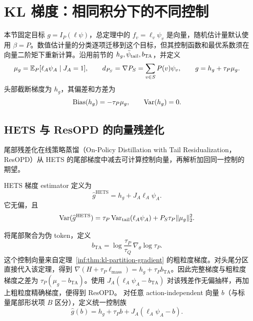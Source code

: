 \section{KL 梯度：相同积分下的不同控制}
\label{est:sec:kl-vector}
本节固定目标 $g=I_P(\ell\psi)$，总定理中的 $f_v=\ell_v\psi_v$ 是向量，随机估计量默认使用 $\beta=P$。数值估计量的分类逐项迁移到这个目标，但其控制函数和最优系数须在向量二阶矩下重新计算。沿用前节的 $h_g,\bar \psi_{\mathrm{tail}},b_{\mathrm{TA}}$，并定义
\begin{equation*}
 \mu_g=\mathbb E_P[\ell_A\psi_A\mid J_A=1],\qquad
 d_{P_S}=\nabla P_S=\sum_{v\in S}P(v)\psi_v,\qquad g=h_g+\tau_P\mu_g.
\end{equation*}
头部截断梯度为 $h_g$，其偏差和方差为
\begin{equation}
 \operatorname{Bias}(h_g)=-\tau_P\mu_g,
 \qquad \operatorname{Var}(h_g)=0.
 \label{est:eq:chapter3-head-grad-bias}
\end{equation}

\subsection{HETS 与 ResOPD 的向量残差化}

尾部残差化在线策略蒸馏（On-Policy Distillation with Tail Residualization，ResOPD）从 HETS 的尾部梯度中减去可计算控制向量，再解析加回同一控制的期望。

HETS 梯度 estimator 定义为
\begin{equation}
 \widehat g^{\mathrm{HETS}}=h_g+J_A \ell_A\psi_A.
 \label{est:eq:chapter3-hets-grad}
\end{equation}
它无偏，且
\begin{equation}
 \operatorname{Var}(\widehat g^{\mathrm{HETS}})
 =\tau_P\operatorname{Var}_{\mathrm{tail}}(\ell_A\psi_A)+P_S\tau_P\lVert\mu_g\rVert_2^2.
 \label{est:eq:chapter3-hets-var}
\end{equation}

将尾部聚合为伪 token，定义
\begin{equation}
 b_{\mathrm{TA}}=\log\frac{\tau_P}{\tau_Q}\,\nabla_\theta\log\tau_P.
 \label{est:eq:chapter3-resopd-control}
\end{equation}
这个控制向量来自定理~\ref{inf:thm:kl-partition-gradient} 的粗粒度梯度。对头尾分区直接代入该定理，得到 $\nabla(H+\tau_P\ell_{\mathrm{mass}})=h_g+\tau_Pb_{\mathrm{TA}}$。因此完整梯度与粗粒度梯度之差为 $\tau_P(\mu_g-b_{\mathrm{TA}})$。使用 $J_A(\ell_A\psi_A-b_{\mathrm{TA}})$ 对该残差作无偏抽样，再加上粗粒度精确梯度，便得到 ResOPD。
对任意 action-independent 向量 $b$（与标量尾部形状项 $B$ 区分），定义统一控制族
\begin{equation}
 \widehat g(b)=h_g+\tau_Pb+J_A(\ell_A\psi_A-b).
 \label{est:eq:chapter3-control-family}
\end{equation}

